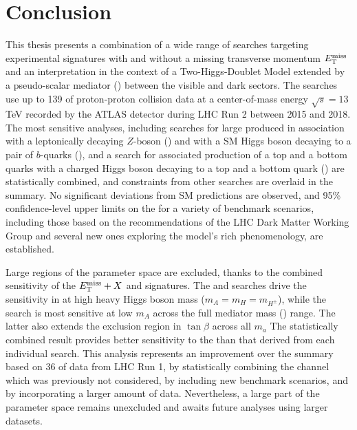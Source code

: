 \chapter{Conclusion}

This thesis presents a combination of a wide range of searches targeting experimental signatures with and without a missing transverse momentum $E_{\mathrm{T}}^{\mathrm{miss}}$ and an interpretation in the context of a Two-Higgs-Doublet Model extended by a pseudo-scalar mediator (\thdma) between the visible and dark sectors. 
The searches use up to 139 \ifb of proton-proton collision data at a center-of-mass energy $\sqrt{s} = 13$ TeV recorded by the ATLAS detector during LHC Run 2 between 2015 and 2018. 
The most sensitive analyses, including searches for large \met produced in association with a leptonically decaying $Z$-boson (\monozll) and with a SM Higgs boson decaying to a pair of $b$-quarks (\monohbb), and a search for associated production of a top and a bottom quarks with a charged Higgs boson decaying to a top and a bottom quark (\htb) are statistically combined, and constraints from other searches are overlaid in the summary.
No significant deviations from SM predictions are observed, and 95\% confidence-level upper limits on the \thdma for a variety of benchmark scenarios, including those based on the recommendations of the LHC Dark Matter Working Group and several new ones exploring the model's rich phenomenology, are established. 

Large regions of the parameter space are excluded, thanks to the combined sensitivity of the $E_{\mathrm{T}}^{\mathrm{miss}}+X$ and \htb signatures.
The \monozll and \monohbb searches drive the sensitivity in at high heavy Higgs boson mass ($m_A=m_H=m_{H^{\pm}}$), while the \htb search is most sensitive at low $m_A$ across the full mediator mass (\ma) range.
The latter also extends the exclusion region in $\tan\beta$ across all $m_a$
The statistically combined result provides better sensitivity to the \thdma than that derived from each individual search. 
This analysis represents an improvement over the summary based on 36 \ifb of data from LHC Run 1, by statistically combining the \htb channel which was previously not considered, by including new benchmark scenarios, and by incorporating a larger amount of data. 
Nevertheless, a large part of the parameter space remains unexcluded and awaits future analyses using larger datasets.

